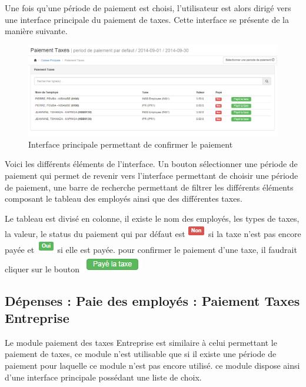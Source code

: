 \documentclass[12pt,a4paper]{report}
\begin{document}
Une fois qu'une période de paiement est choisi, l'utilisateur est alors dirigé vers une interface principale du paiement de taxes. Cette interface se présente de la manière suivante.

\begin{figure}[h]
\begin{center}
\includegraphics[width=14cm]{pic/PaieTaxes2.png}
\end{center}
\caption{Interface principale permettant de confirmer le paiement}
\label{Interface principale permettant de confirmer le paiement}
\end{figure}


Voici les différents éléments de l'interface. Un bouton sélectionner une période de paiement qui permet de revenir vers l'interface permettant de choisir une période de paiement, une barre de recherche permettant de filtrer les différents éléments composant le tableau des employés ainsi que des différentes taxes.

Le tableau est divisé en colonne, il existe le nom des employés, les types de taxes, la valeur, le status du paiement qui par défaut est \includegraphics[scale=0.7]{pic/NonTaxes.png} si la taxe n'est pas encore payée et \includegraphics[scale=0.7]{pic/OuiTaxes.png} si elle est payée. pour confirmer le paiement d'une taxe, il faudrait cliquer sur le bouton \includegraphics[scale=0.7]{pic/PayeTaxe.png}


\newpage
\subsection{Dépenses : Paie des employés : Paiement Taxes Entreprise}
Le module paiement des taxes Entreprise est similaire à celui permettant le paiement de taxes,  ce module n'est utilisable que si il existe une période de paiement pour laquelle ce module n'est pas encore utilisé. ce module dispose ainsi d'une interface principale possédant une liste de choix.
\end{document}
